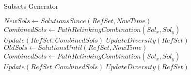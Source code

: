 \begin{algorithm}
  \caption{Subsets Generator}\label{ss_subsets}
  \begin{algorithmic}[0]
    \State $NewSols \gets SolutionsSince(RefSet,NowTime)$
    \State $CombinedSols \gets PathRelinkingCombination(Sol_x,Sol_y)$
    \State $Update(RefSet,CombinedSols)$
    \EndIf \EndFor
    \State $UpdateDiversity(RefSet)$
    \State $OldSols \gets SolutionsUntil(RefSet,NowTime)$
    \State $CombinedSols \gets PathRelinkingCombination(Sol_x,Sol_y)$
    \State $Update(RefSet,CombinedSols)$
    \EndIf \EndFor
    \State $UpdateDiversity(RefSet)$
    \EndFor \EndIf
    \EndProcedure
  \end{algorithmic}
\end{algorithm}
